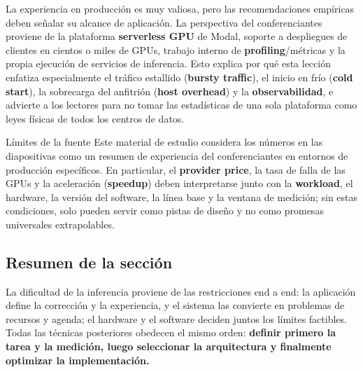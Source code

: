 La experiencia en producción es muy valiosa, pero las recomendaciones empíricas deben señalar su alcance de aplicación. La perspectiva del conferenciantes proviene de la plataforma \textbf{serverless GPU} de Modal, soporte a despliegues de clientes en cientos o miles de GPUs, trabajo interno de \textbf{profiling}/métricas y la propia ejecución de servicios de inferencia. Esto explica por qué esta lección enfatiza especialmente el tráfico estallido (\textbf{bursty traffic}), el inicio en frío (\textbf{cold start}), la sobrecarga del anfitrión (\textbf{host overhead}) y la \textbf{observabilidad}, e advierte a los lectores para no tomar las estadísticas de una sola plataforma como leyes físicas de todos los centros de datos.


\begin{warningbox}{Límites de la fuente}
Este material de estudio considera los números en las diapositivas como un resumen de experiencia del conferenciantes en entornos de producción específicos. En particular, el \textbf{provider price}, la tasa de falla de las GPUs y la aceleración (\textbf{speedup}) deben interpretarse junto con la \textbf{workload}, el hardware, la versión del software, la línea base y la ventana de medición; sin estas condiciones, solo pueden servir como pistas de diseño y no como promesas universales extrapolables.
\end{warningbox}

\subsection{Resumen de la sección}

La dificultad de la inferencia proviene de las restricciones end a end: la aplicación define la corrección y la experiencia, y el sistema las convierte en problemas de recursos y agenda; el hardware y el software deciden juntos los límites factibles. Todas las técnicas posteriores obedecen el mismo orden: \textbf{definir primero la tarea y la medición, luego seleccionar la arquitectura y finalmente optimizar la implementación.}


